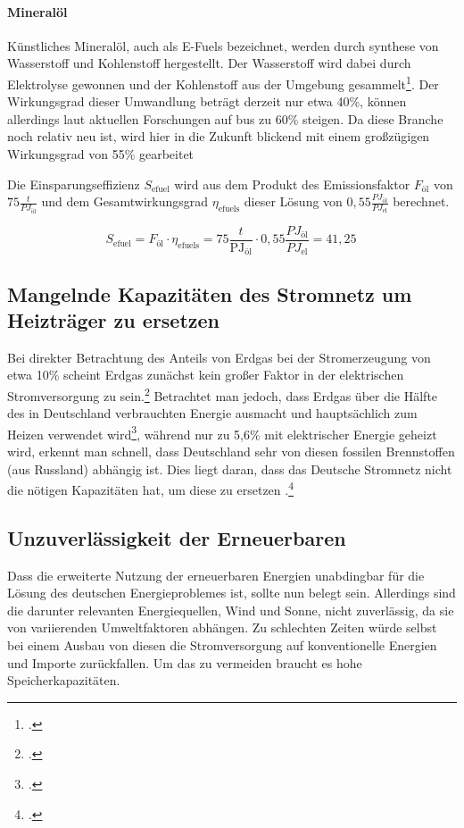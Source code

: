 \documentclass[12pt, ngerman]{article}
\newcommand{\el}{_{\text{el}}}
\begin{document}
    \paragraph{Mineralöl}


    Künstliches Mineralöl, auch als E-Fuels bezeichnet, werden durch synthese von Wasserstoff und Kohlenstoff
    hergestellt.
    Der Wasserstoff wird dabei durch Elektrolyse gewonnen und der Kohlenstoff aus der Umgebung
    gesammelt\footcite{EFuel2022}.
    Der Wirkungsgrad dieser Umwandlung beträgt derzeit nur etwa 40\%, können allerdings laut aktuellen Forschungen
    auf bus zu 60\% steigen.
    Da diese Branche noch relativ neu ist, wird hier in die Zukunft blickend mit einem großzügigen Wirkungsgrad von
    55\% gearbeitet

    Die Einsparungseffizienz \(S_{\text{efuel}}\) wird aus dem Produkt des Emissionsfaktor \(F_{\text{öl}}\) von
    \(75\frac{t}{PJ_{\text{öl}}}\)
    und dem Gesamtwirkungsgrad \(\eta_{\text{efuels}}\) dieser Lösung von $0,55\frac{PJ_{\text{öl}}}{PJ\el}$ berechnet.


    \[S_\text{efuel} = F_{\text{öl}} \cdot \eta_{\text{efuels}} = 75\frac{t}{\text{PJ}_{\text{öl}}} \cdot 0,
    55\frac{PJ_\text{öl}}{PJ\el} = 41,25\frac{}{}\] 

    \subsection{Mangelnde Kapazitäten des Stromnetz um Heizträger zu ersetzen}

    Bei direkter Betrachtung des Anteils von Erdgas bei der Stromerzeugung von etwa 10\% scheint Erdgas zunächst kein
    großer Faktor in der elektrischen Stromversorgung zu sein.\footcite{SMARDHoherEEAnteil,EnergieWofurErdgas}
    Betrachtet man jedoch, dass Erdgas über die Hälfte des in Deutschland verbrauchten Energie ausmacht und
    hauptsächlich zum Heizen verwendet wird\footcite{Anwendungsbereiche,EnergieWofurErdgas},
    während nur zu 5,6\% mit elektrischer Energie geheizt wird, erkennt man schnell, dass Deutschland sehr von diesen
    fossilen Brennstoffen (aus Russland) abhängig ist.
    Dies liegt daran, dass das Deutsche Stromnetz nicht die nötigen Kapazitäten hat, um diese zu ersetzen
    .\footcite{EnergieWofurErdgas}

    \subsection{Unzuverlässigkeit der Erneuerbaren}
    Dass die erweiterte Nutzung der erneuerbaren Energien unabdingbar für die Lösung des deutschen Energieproblemes
    ist, sollte nun belegt sein.
    Allerdings sind die darunter relevanten Energiequellen, Wind und Sonne, nicht zuverlässig, da sie von
    variierenden Umweltfaktoren abhängen.
    Zu schlechten Zeiten würde selbst bei einem Ausbau von diesen die Stromversorgung auf konventionelle Energien und
    Importe zurückfallen.
    Um das zu vermeiden braucht es hohe Speicherkapazitäten.
\end{document}
